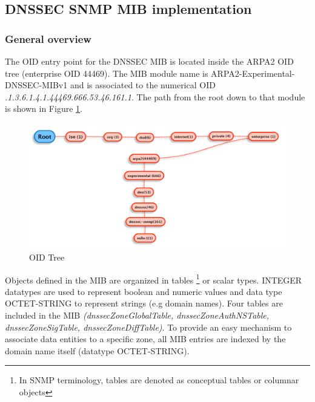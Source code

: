 \subsection{DNSSEC SNMP MIB implementation}
\label{section:dnssec-mib-implementation}

\subsubsection{General overview}
The OID entry point for the DNSSEC MIB is located inside the ARPA2 OID tree (enterprise OID 44469). The MIB module name is ARPA2-Experimental-DNSSEC-MIBv1 and is associated to the numerical OID \textit{.1.3.6.1.4.1.44469.666.53.46.161.1}. The path from the root down to that module is shown in Figure \ref{figure:oid-tree}.

\begin{figure}[H]
\centering
\includegraphics[scale=0.4]{Images/oid-tree.pdf}
\caption{OID Tree}
\label{figure:oid-tree}
\end{figure}


Objects defined in the MIB are organized in tables \footnote{In SNMP terminology, tables are denoted as conceptual tables or columnar objects} or scalar types. INTEGER datatypes are used to represent boolean and numeric values and data type  OCTET-STRING to represent strings (e.g domain names). Four tables are included in the MIB \textit{(dnssecZoneGlobalTable, dnssecZoneAuthNSTable, dnssecZoneSigTable, dnssecZoneDiffTable)}. To provide an easy mechanism to associate data entities to a specific zone, all MIB entries are indexed by the domain name itself (datatype OCTET-STRING).
\\
